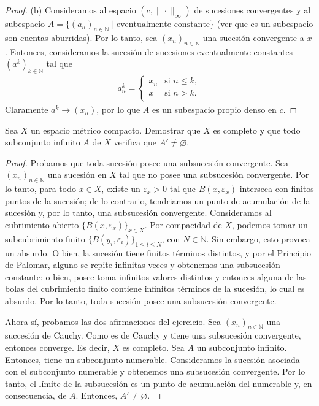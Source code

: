 \begin{proof}
    (b) Consideramos al espacio $(c, \| \cdot \|_{\infty})$ de sucesiones convergentes y al subespacio $A = \{(a_n)_{n \in \mathbb{N}} \mid \text{eventualmente constante} \}$ (ver que es un subespacio son cuentas aburridas). Por lo tanto, sea $(x_n)_{n \in \mathbb{N}}$ una sucesión convergente a $x$. Entonces, consideramos la sucesión de sucesiones eventualmente constantes $(a^k)_{k \in \mathbb{N}}$ tal que 
    \begin{align*}
        a_n^k = \begin{cases}
            x_n &\text{si } n \leq k, \\
            x &\text{si } n > k. \\
        \end{cases}
    \end{align*}
    Claramente $a^k \to (x_n)$, por lo que $A$ es un subespacio propio denso en $c$.
\end{proof}

\begin{exercise}
    Sea $X$ un espacio métrico compacto. Demostrar que $X$ es completo y que todo subconjunto infinito $A$ de $X$ verifica que $A' \neq \varnothing$.
\end{exercise}

\begin{proof}
    Probamos que toda sucesión posee una subsucesión convergente. Sea $(x_n)_{n \in \mathbb{N}}$ una sucesión en $X$ tal que no posee una subsucesión convergente. Por lo tanto, para todo $x \in X$, existe un $\varepsilon_x > 0$ tal que $B(x, \varepsilon_x)$ interseca con finitos puntos de la sucesión; de lo contrario, tendriamos un punto de acumulación de la sucesión y, por lo tanto, una subsucesión convergente. Consideramos al cubrimiento abierto $\{ B(x, \varepsilon_x) \}_{x \in X}$. Por compacidad de $X$, podemos tomar un subcubrimiento finito $\{ B(y_i, \varepsilon_i) \}_{1 \leq i \leq N}$, con $N \in \mathbb{N}$. Sin embargo, esto provoca un absurdo. O bien, la sucesión tiene finitos términos distintos, y por el Principio de Palomar, alguno se repite infinitas veces y obtenemos una subsucesión constante; o bien, posee toma infinitos valores distintos y entonces alguna de las bolas del cubrimiento finito contiene infinitos términos de la sucesión, lo cual es absurdo. Por lo tanto, toda sucesión posee una subsucesión convergente.

    Ahora sí, probamos las dos afirmaciones del ejercicio. Sea $(x_n)_{n \in \mathbb{N}}$ una succesión de Cauchy. Como es de Cauchy y tiene una subsucesión convergente, entonces converge. Es decir, $X$ es completo. Sea $A$ un subconjunto infinito. Entonces, tiene un subconjunto numerable. Consideramos la sucesión asociada con el subconjunto numerable y obtenemos una subsucesión convergente. Por lo tanto, el límite de la subsucesión es un punto de acumulación del numerable y, en consecuencia, de $A$. Entonces, $A' \neq \varnothing$.
\end{proof}

